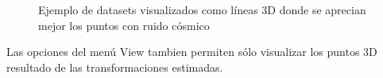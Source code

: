 \begin{figure}[H]
\begin{center}
\hspace{0.5cm}

\end{center}

\caption{Ejemplo de datasets visualizados como líneas 3D donde se aprecian mejor los puntos con ruido cósmico}
\end{figure}

Las opciones del menú View tambien permiten sólo visualizar los puntos 3D resultado de las transformaciones estimadas.

    
    


